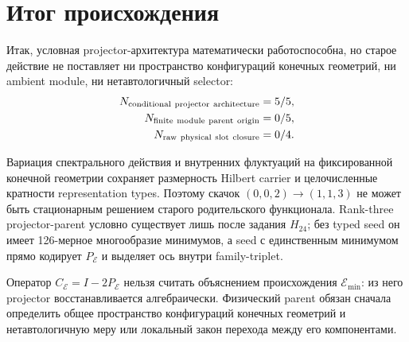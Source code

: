\section{Итог происхождения}

Итак, условная projector-архитектура математически работоспособна, но
старое действие не поставляет ни пространство конфигураций конечных геометрий,
ни ambient module, ни нетавтологичный selector:
\begin{equation}
 \begin{aligned}
 N_{\rm conditional\ projector\ architecture}&=5/5,\\
 N_{\rm finite\ module\ parent\ origin}&=0/5,\\
 N_{\rm raw\ physical\ slot\ closure}&=0/4.
 \end{aligned}
 \label{eq:v9-endpoint-parent-final-ledgers}
\end{equation}

\begin{theorem}
Вариация спектрального действия и внутренних флуктуаций на фиксированной
конечной геометрии сохраняет размерность Hilbert carrier и целочисленные
кратности representation types. Поэтому скачок $(0,0,2)\to(1,1,3)$ не
может быть стационарным решением старого родительского функционала. Rank-three projector-parent
условно существует лишь после задания $H_{24}$; без typed seed он имеет
126-мерное многообразие минимумов, а seed с единственным минимумом прямо
кодирует $P_{\mathcal E}$ и выделяет ось внутри family-triplet.
\end{theorem}

\begin{nogocriterion}
Оператор $C_{\mathcal E}=I-2P_{\mathcal E}$ нельзя считать объяснением
происхождения $\mathcal E_{\min}$: из него projector восстанавливается
алгебраически. Физический parent обязан сначала определить общее
пространство конфигураций конечных геометрий и нетавтологичную меру или локальный
закон перехода между его компонентами.
\end{nogocriterion}

